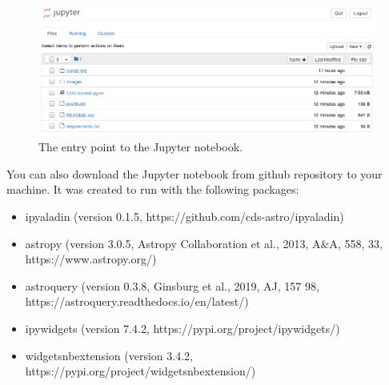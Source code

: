 \documentclass [a4paper, 12pt]{article}
\begin{document}
\begin{figure}[H]
    \center
    \includegraphics[width=0.7 \textwidth]
    {../images/jupyter_open-notebook.png}
    \caption{The entry point to the Jupyter notebook. }
    \label{fig:notebook}
\end{figure}

You can also download the Jupyter notebook from github repository to your
machine. It was created to run with the following packages:
\begin{itemize}
    \item ipyaladin (version 0.1.5, https://github.com/cds-astro/ipyaladin)
    \item astropy (version 3.0.5, Astropy Collaboration et al., 2013, A\&A,
    558, 33, https://www.astropy.org/)
    \item astroquery (version 0.3.8, Ginsburg et al., 2019, AJ, 157 98,
    https://astroquery.readthedocs.io/en/latest/)
    \item ipywidgets (version 7.4.2, https://pypi.org/project/ipywidgets/)
    \item widgetsnbextension (version 3.4.2,
    https://pypi.org/project/widgetsnbextension/)
\end{itemize}
\end{document}
